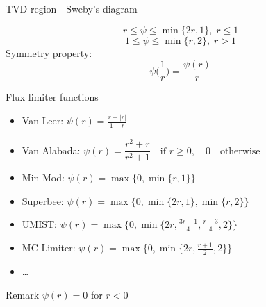 \documentclass{beamer}
\begin{document}
\begin{frame}{TVD region - Sweby's diagram}
\begin{minipage}[t]{0.63\textwidth}
\begin{figure}
	\centering
	\hspace{-1.24cm}
	
\end{figure}
\end{minipage}
\begin{minipage}[t]{0.35\textwidth}
	\vspace{1cm}
\begin{equation*}
	r \leq \psi \leq \min \{2r, 1\}, \; r\leq1
\end{equation*}
\begin{equation*}
	1 \leq \psi \leq \min \{r, 2\}, \; r>1
\end{equation*}
	Symmetry property:
	\begin{equation*}
	\psi\bigg(\frac{1}{r}\bigg) = \frac{\psi(r)}{r}
	\end{equation*}
\end{minipage}
\end{frame}
\begin{frame}{Flux limiter functions}
	\begin{itemize}
	\item Van Leer: $\psi(r) = \frac{r+|r|}{1+r}$
	\item Van Alabada: $\psi(r)= \dfrac{r^2+r}{r^2+1} \quad \text{if $r\geq 
		0$}, \quad 0 \quad \text{otherwise}$
	\item Min-Mod: 	$\psi(r) = \max \{0, \min \{ r,1\} \}$
	\vspace{0.4\baselineskip}
	\item Superbee: $\psi(r)=\max \{0, \min \{ 2r, 1\}, \min \{ r, 2\} \}$
	\vspace{0.2\baselineskip}
	\item UMIST: $\psi(r)=\max \bigg\{0, \min \bigg\{ 2r, \frac{3r+1}{4}, 
	\frac{r+3}{4}, 2\bigg\} \bigg\}$
	\item MC Limiter: $\psi(r)=\max \bigg\{0, \min \bigg\{ 2r, \frac{r+1}{2}, 
	2\bigg\} \bigg\}$
	\item \dots
	\end{itemize}
\begin{block}{Remark} %
	\centering
$\psi(r) = 0$ for $r<0$
\end{block}
\end{frame}
\end{document}
